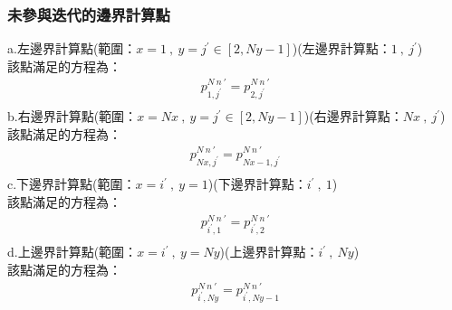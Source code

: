 \documentclass[12pt]{article}
\newcommand{\chinese}[1]{%
  \ifcase#1 零\or 一\or 二\or 三\or 四\or 五\or 六\or 七\or 八\or 九\or 十\or
  十一\or 十二\or 十三\or 十四\or 十五\or 十六\or 十七\or 十八\or 十九\or 二十\fi
}
\renewcommand{\thesection}{\chinese{\value{section}}}
\renewcommand{\theequation}{\chinese{\value{section}}.\arabic{equation}}
\begin{document}
\subsubsection{未參與迭代的邊界計算點}
\noindent a.左邊界計算點(範圍：$x = 1\ ,\ y = j^{\prime} \in [2,Ny-1]$)(左邊界計算點：$1\ ,\ j^{\prime}$)\\[1.5ex]
\noindent 該點滿足的方程為：
\begin{equation}\begin{split}
    p_{1,j^{\prime}}^{N\ n\ \prime} = p_{2,j^{\prime}}^{N\ n\ \prime}\\[1.5ex]
\end{split}\end{equation}
\noindent b.右邊界計算點(範圍：$x = Nx\ ,\ y = j^{\prime} \in [2,Ny-1]$)(右邊界計算點：$Nx\ ,\ j^{\prime}$)\\[1.5ex]
\noindent 該點滿足的方程為：
\begin{equation}\begin{split}
    p_{Nx,j^{\prime}}^{N\ n\ \prime} = p_{Nx-1,j^{\prime}}^{N\ n\ \prime}\\[1.5ex]
\end{split}\end{equation}
\noindent c.下邊界計算點(範圍：$x = i^{\prime}\ ,\ y = 1$)(下邊界計算點：$i^{\prime}\ ,\ 1$)\\[1.5ex]
\noindent 該點滿足的方程為：
\begin{equation}\begin{split}
    p_{i^{\prime},1}^{N\ n\ \prime} = p_{i^{\prime},2}^{N\ n\ \prime}\\[1.5ex]
\end{split}\end{equation}
\noindent d.上邊界計算點(範圍：$x = i^{\prime}\ ,\ y = Ny$)(上邊界計算點：$i^{\prime}\ ,\ Ny$)\\[1.5ex]
\noindent 該點滿足的方程為：
\begin{equation}\begin{split}
    p_{i^{\prime},Ny}^{N\ n\ \prime} = p_{i^{\prime},Ny-1}^{N\ n\ \prime}\\[1.5ex]
\end{split}\end{equation}

\newpage
\appendix
{}%
\end{document}
